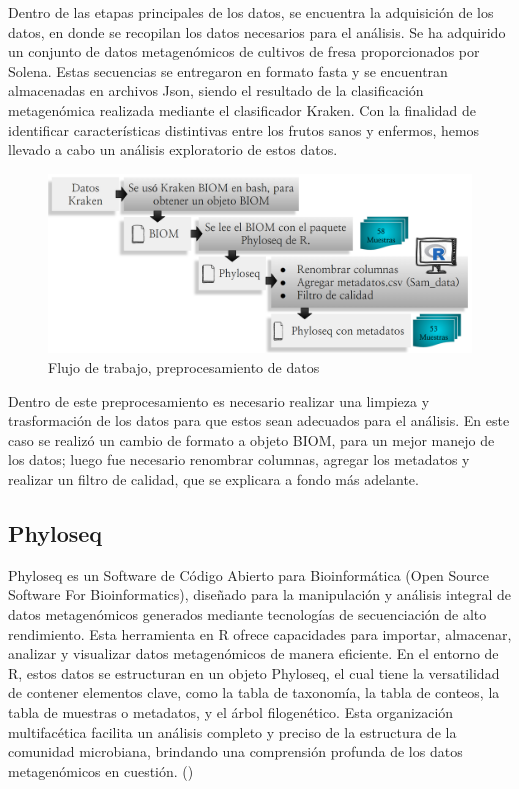 Dentro de las etapas principales de los datos, se encuentra la adquisición de los datos, en donde se recopilan los datos necesarios para el análisis. Se ha adquirido un conjunto de datos metagenómicos de cultivos de fresa proporcionados por Solena. Estas secuencias se entregaron en formato fasta y se encuentran almacenadas en archivos Json, siendo el resultado de la clasificación metagenómica realizada mediante el clasificador Kraken. Con la finalidad de identificar características distintivas entre los frutos sanos y enfermos, hemos llevado a cabo un análisis exploratorio de estos datos.\\

\begin{figure}[h]
\centering
\includegraphics[width=\textwidth]{Img/cap2/preprosecamiento.png}
\caption{Flujo de trabajo, preprocesamiento de datos}
\end{figure}

Dentro de este preprocesamiento es necesario realizar una limpieza y trasformación de los datos para que estos sean adecuados para el análisis. En este caso se realizó un cambio de formato a objeto BIOM, para un mejor manejo de los datos; luego fue necesario renombrar columnas, agregar los metadatos y realizar un filtro de calidad, que se explicara a fondo más adelante.\\

\subsection{Phyloseq}

Phyloseq es un Software de Código Abierto para Bioinformática (Open Source Software For Bioinformatics), diseñado para la manipulación y análisis integral de datos metagenómicos generados mediante tecnologías de secuenciación de alto rendimiento. Esta herramienta en R ofrece capacidades para importar, almacenar, analizar y visualizar datos metagenómicos de manera eficiente. En el entorno de R, estos datos se estructuran en un objeto Phyloseq, el cual tiene la versatilidad de contener elementos clave, como la tabla de taxonomía, la tabla de conteos, la tabla de muestras o metadatos, y el árbol filogenético. Esta organización multifacética facilita un análisis completo y preciso de la estructura de la comunidad microbiana, brindando una comprensión profunda de los datos metagenómicos en cuestión. (\cite{mcmurdie2013})\\

